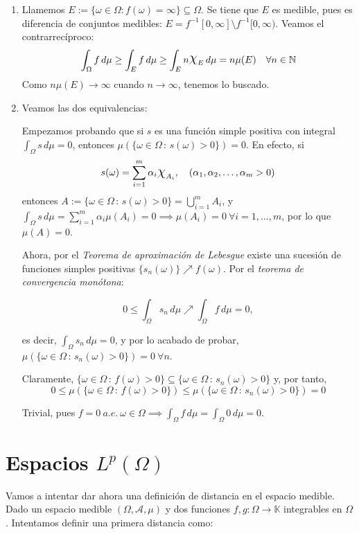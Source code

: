 \documentclass[11pt, a4paper]{article}
\makeatletter
\newif\IfInSansMode
\let\oldsf\sffamily
\renewcommand*{\sffamily}{\oldsf\mathversion{sans}\InSansModetrue}
\let\oldnorm\normalfont
\renewcommand*{\normalfont}{\oldnorm\InSansModefalse\mathversion{normal}}
\DeclareRobustCommand{\rchi}{{\Large \mathpalette\irchi\relax}}
\newcommand{\irchi}[2]{\raisebox{0.4\depth}{$#1\chi$}} %
\newcommand{\W}{\Omega}
\newcommand{\w}{\omega}
\renewenvironment{proof}[1][\proofname] {\par\pushQED{\qed}\normalfont\topsep6\p@\@plus6\p@\relax\trivlist\item[\hskip\labelsep\itshape\sffamily#1\@addpunct{.}]\ignorespaces}{\popQED\endtrivlist\@endpefalse}
\theoremstyle{theorem-style}
\theoremstyle{definition-style}
\theoremstyle{remark-style}
\theoremstyle{example-style}
\newenvironment{nlist}
{\begin{enumerate}
    \renewcommand\labelenumi{(\emph{\roman{enumi})}}}
  {\end{enumerate}}
\makeatother
\begin{document}
    \begin{proof} \hfill
    \begin{nlist}
    \item Llamemos $E := \{\w \in \W: f(\w) = \infty\} \subseteq \W$. Se tiene que $E$ es medible, pues es diferencia de conjuntos medibles: $E = f^{-1}[0,\infty] \setminus f^{-1}[0,\infty)$. Veamos el contrarrecíproco: $$\int_\W f\, d\mu \ge \int_E f\,d\mu \ge \int_E n\rchi_E\,d\mu = n\mu(E) \quad \forall n \in \mathbb{N}$$
    Como $n\mu(E) \to \infty$ cuando $n\to \infty$, tenemos lo buscado.
    \item Veamos las dos equivalencias:
    
    \boxed{\Rightarrow}  Empezamos probando que si $s$ es una función simple positiva con integral $\int_\Omega s \, d\mu = 0$, entonces $\mu(\{ \omega\in\Omega \, :\, s(\omega) >0\} ) = 0$. En efecto, si $$s(\omega)=\sum_{i=1}^m \alpha_i \text{\Large$\chi$}_{A_i}, \quad (\alpha_1,\alpha_2,\dots,\alpha_m > 0)$$ entonces $\displaystyle A:=\{ \omega\in\Omega \, :\, s(\omega) >0\} = \bigcup_{i=1}^m A_i$, y $\displaystyle \int_\Omega s \, d\mu = \sum_{i=1}^m \alpha_i \mu (A_i) = 0 \implies\mu(A_i)=0\ \forall i=1,\dots , m$, por lo que $\mu(A)=0 $.

Ahora, por el \textit{Teorema de aproximación de Lebesgue} existe una sucesión de funciones simples positivas $\{ s_n(\omega)\}\nearrow f(\omega)$. Por el \textit{teorema de convergencia monótona}: 

$$0\leq \int_\Omega s_n \, d\mu \nearrow \int_\Omega f\, d\mu = 0,$$

es decir, $\displaystyle \int_\Omega s_n \, d\mu=0$, y por lo acabado de probar, $\mu(\{ \omega\in\Omega \, :\, s_n(\omega) >0\} ) = 0 \ \forall n$. 

Claramente, $\{ \omega\in\Omega \, :\,f(\omega) >0\}\subseteq \{ \omega\in\Omega \, :\, s_n(\omega) >0\}$ y, por tanto, $$0\leq \mu (\{ \omega\in\Omega \, :\,f(\omega) >0\} ) \leq \mu(\{ \omega\in\Omega \, :\, s_n(\omega) >0\} ) = 0$$

\boxed{\Leftarrow} Trivial, pues $f=0\ a.e.\ \w \in \W \implies \int_\W f\, d\mu = \int_\W 0\, d\mu = 0$.
\end{nlist}
\end{proof}

\section{Espacios $L^p(\W)$}

Vamos a intentar dar ahora una definición de distancia en el espacio medible. Dado un espacio medible $(\Omega, \mathscr A, \mu)$ y dos funciones $f, g: \Omega \rightarrow \mathbb K$ integrables en $\Omega$. Intentamos definir una primera distancia como:
\end{document}
